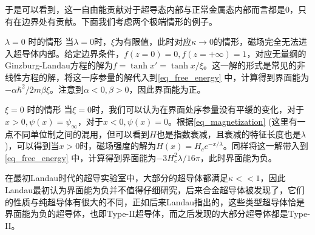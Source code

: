 于是可以看到，这一自由能贡献对于超导态内部与正常金属态内部而言都是0，只有在边界处有贡献。下面我们考虑两个极端情形的例子。
\begin{example}{$\lambda =0$ 时的情形}
当$\lambda=0$时，$\xi$为有限值，此时对应$\kappa \rightarrow 0$的情形，磁场完全无法进入超导体内部。给定边界条件，$f(z=0)=0, f(z=+\infty) = 1$，对应无量纲的Ginzburg-Landau方程的解为$f=\tanh x' = \tanh x/\xi$。这一解的形式是常见的非线性方程的解，将这一序参量的解代入到\autoref{eq_free_energy} 中，计算得到界面能为$-\alpha \hbar^2/2m \beta\xi$。注意到$\alpha<0,\beta>0$，因此界面能为正。
\end{example}
\begin{example}{$\xi = 0$ 时的情形}
当$\xi = 0$时，我们可以认为在界面处序参量没有平缓的变化，对于$x>0,\psi(x) = \psi_{\infty}$，对于$x<0,\psi(x)=0$。根据\autoref{eq_magnetization} (这里有一点不同单位制之间的混用，但可以看到$H$也是指数衰减，且衰减的特征长度也是$\lambda$)，可以得到当$x>0$时，磁场强度的解为$H(x) = H_c e^{-x/\lambda}$。同样将这一解带入到\autoref{eq_free_energy} 中，计算得到界面能为$-3H_c^2 \lambda/16\pi$，此时界面能为负。
\end{example}
在最初Landau时代的超导实验室中，大部分的超导体都满足$\kappa <<1$，因此Landau最初认为界面能为负并不值得仔细研究，后来合金超导体被发现了，它们的性质与纯超导体有很大的不同，正如后来Landau指出的，这些类型超导体恰是界面能为负的超导体，也即Type-II超导体，而之后发现的大部分超导体都是Type-II。
